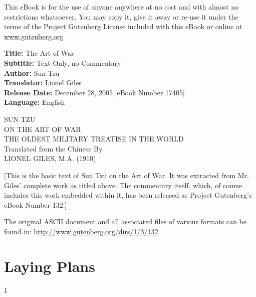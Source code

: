 \footnotesize\vspace*{1em} This eBook is for the use of anyone anywhere at
no cost and with almost no restrictions whatsoever. You may copy it,
give it away or re-use it under the terms of the Project Gutenberg
License included with this eBook or online at
\href{http://www.gutenberf.org}{www.gutenberg.org} \vspace*{1em}

\noindent\textbf{Title:} The Art of War\\
\textbf{Subtitle:} Text Only, no Commentary\\
\textbf{Author:} Sun Tzu\\
\textbf{Translator:} Lionel Giles\\
\textbf{Release Date:} December 28, 2005  [eBook Number 17405]\\
\textbf{Language:} English
\begin{center}
  SUN TZU \\
  ON THE ART OF WAR \\
  THE OLDEST MILITARY TREATISE IN THE WORLD\\

  Translated from the Chinese By \\LIONEL GILES, M.A. (1910)
\end{center}

[This is the basic text of Sun Tzu on the Art of War.  It was
extracted from Mr. Giles' complete work as titled above.  The
commentary itself, which, of course includes this work embedded
within it, has been released as Project Gutenberg's eBook Number 132.]

The original ASCII document and all associated files of various
formats can be found in:
\href{http://www.gutenberg.org/dirs/1/3/132}{http://www.gutenberg.org/dirs/1/3/132}
\clearpage

\thispagestyle{ruled}
\pagestyle{ruled}

\setlength{\parskip}{0em}
\tableofcontents*

\setlength{\parskip}{0em}

\clearpage

\normalsize
\setcounter{chapter}{1}
\chapter*{Laying Plans}
1

